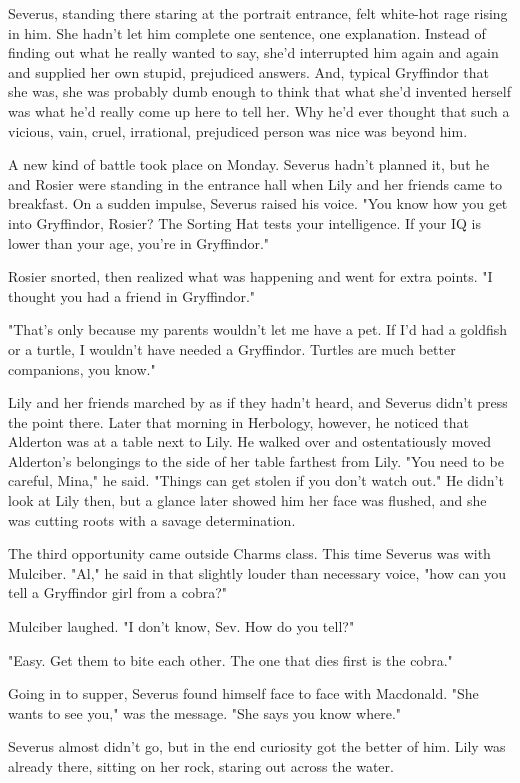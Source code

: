 Severus, standing there staring at the portrait entrance, felt white-hot rage rising in him. She hadn't let him complete one sentence, one explanation. Instead of finding out what he really wanted to say, she'd interrupted him again and again and supplied her own stupid, prejudiced answers. And, typical Gryffindor that she was, she was probably dumb enough to think that what she'd invented herself was what he'd really come up here to tell her. Why he'd ever thought that such a vicious, vain, cruel, irrational, prejudiced person was nice was beyond him.

A new kind of battle took place on Monday. Severus hadn't planned it, but he and Rosier were standing in the entrance hall when Lily and her friends came to breakfast. On a sudden impulse, Severus raised his voice. "You know how you get into Gryffindor, Rosier? The Sorting Hat tests your intelligence. If your IQ is lower than your age, you're in Gryffindor."

Rosier snorted, then realized what was happening and went for extra points. "I thought you had a friend in Gryffindor."

"That's only because my parents wouldn't let me have a pet. If I'd had a goldfish or a turtle, I wouldn't have needed a Gryffindor. Turtles are much better companions, you know."

Lily and her friends marched by as if they hadn't heard, and Severus didn't press the point there. Later that morning in Herbology, however, he noticed that Alderton was at a table next to Lily. He walked over and ostentatiously moved Alderton's belongings to the side of her table farthest from Lily. "You need to be careful, Mina," he said. "Things can get stolen if you don't watch out." He didn't look at Lily then, but a glance later showed him her face was flushed, and she was cutting roots with a savage determination.

The third opportunity came outside Charms class. This time Severus was with Mulciber. "Al," he said in that slightly louder than necessary voice, "how can you tell a Gryffindor girl from a cobra?"

Mulciber laughed. "I don't know, Sev. How do you tell?"

"Easy. Get them to bite each other. The one that dies first is the cobra."

Going in to supper, Severus found himself face to face with Macdonald. "She wants to see you," was the message. "She says you know where."

Severus almost didn't go, but in the end curiosity got the better of him. Lily was already there, sitting on her rock, staring out across the water.

